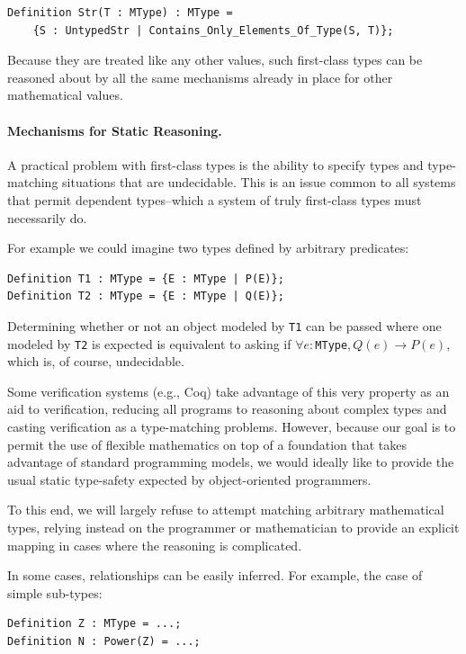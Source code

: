 \begin{lstlisting}
Definition Str(T : MType) : MType = 
	{S : UntypedStr | Contains_Only_Elements_Of_Type(S, T)};
\end{lstlisting}

Because they are treated like any other values, such first-class types can be reasoned about by all the same mechanisms already in place for other mathematical values.

\paragraph{Mechanisms for Static Reasoning.}\label{sec:staticreasoning}
A practical problem with first-class types is the ability to specify types and type-matching situations that are undecidable.  This is an issue common to all systems that permit dependent types--which a system of truly first-class types must necessarily do.

For example we could imagine two types defined by arbitrary predicates:

\begin{lstlisting}
Definition T1 : MType = {E : MType | P(E)};
Definition T2 : MType = {E : MType | Q(E)};
\end{lstlisting}

Determining whether or not an object modeled by \texttt{T1} can be passed where one modeled by \texttt{T2} is expected is equivalent to asking if $\forall e : $\texttt{MType}$, Q(e) \rightarrow P(e)$, which is, of course, undecidable.

Some verification systems (e.g., Coq) take advantage of this very property as an aid to verification, reducing all programs to reasoning about complex types and casting verification as a type-matching problems.  However, because our goal is to permit the use of flexible mathematics on top of a foundation that takes advantage of standard programming models, we would ideally like to provide the usual static type-safety expected by object-oriented programmers.

To this end, we will largely refuse to attempt matching arbitrary mathematical types, relying instead on the programmer or mathematician to provide an explicit mapping in cases where the reasoning is complicated.

In some cases, relationships can be easily inferred.  For example, the case of simple sub-types:

\begin{lstlisting}
Definition Z : MType = ...;
Definition N : Power(Z) = ...;
\end{lstlisting}


